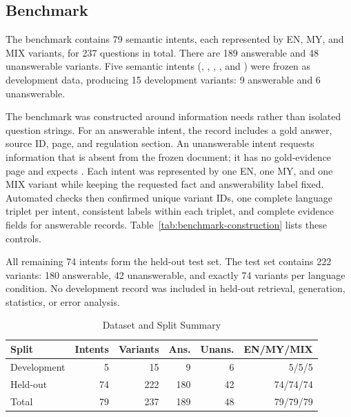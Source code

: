 \documentclass[a4paper,conference]{IEEEtran}
\newcommand{\code}[1]{\texttt{\detokenize{#1}}}
\begin{document}
\subsection{Benchmark}
The benchmark contains 79 semantic intents, each represented by EN, MY, and MIX variants, for 237 questions in total. There are 189 answerable and 48 unanswerable variants. Five semantic intents (\code{Q002}, \code{Q008}, \code{Q024}, \code{Q029}, and \code{Q057}) were frozen as development data, producing 15 development variants: 9 answerable and 6 unanswerable.

The benchmark was constructed around information needs rather than isolated question strings. For an answerable intent, the record includes a gold answer, source ID, page, and regulation section. An unanswerable intent requests information that is absent from the frozen document; it has no gold-evidence page and expects \code{ABSTAIN}. Each intent was represented by one EN, one MY, and one MIX variant while keeping the requested fact and answerability label fixed. Automated checks then confirmed unique variant IDs, one complete language triplet per intent, consistent labels within each triplet, and complete evidence fields for answerable records. Table~\ref{tab:benchmark-construction} lists these controls.

All remaining 74 intents form the held-out test set. The test set contains 222 variants: 180 answerable, 42 unanswerable, and exactly 74 variants per language condition. No development record was included in held-out retrieval, generation, statistics, or error analysis.

\begin{table}[t]
\caption{Dataset and Split Summary}
\label{tab:dataset}
\centering
\footnotesize
\setlength{\tabcolsep}{3.5pt}
\begin{tabular}{|l|r|r|r|r|r|}
\hline
Split & Intents & Variants & Ans. & Unans. & EN/MY/MIX \\
\hline
Development & 5 & 15 & 9 & 6 & 5/5/5 \\
\hline
Held-out & 74 & 222 & 180 & 42 & 74/74/74 \\
\hline
Total & 79 & 237 & 189 & 48 & 79/79/79 \\
\hline
\end{tabular}
\end{table}
\end{document}
